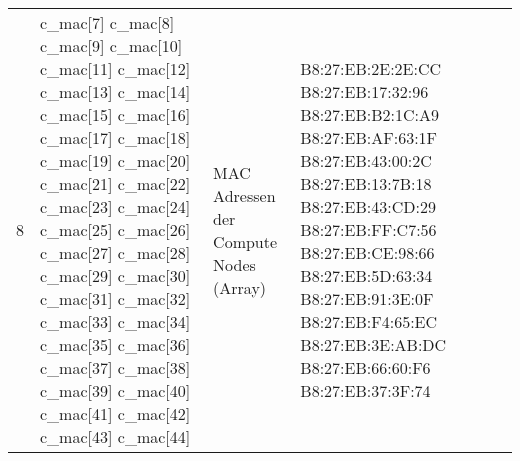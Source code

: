 \begin{longtable}{| p{0.5cm} | p{3cm} | p{8.5cm} | p{4cm} |}
8 & c\_mac[7] \newline c\_mac[8] \newline c\_mac[9] \newline  c\_mac[10] \newline c\_mac[11] \newline c\_mac[12] \newline c\_mac[13] \newline c\_mac[14] \newline c\_mac[15] \newline c\_mac[16] \newline c\_mac[17] \newline c\_mac[18] \newline c\_mac[19] \newline c\_mac[20] \newline c\_mac[21] \newline c\_mac[22] \newline c\_mac[23] \newline c\_mac[24] \newline c\_mac[25] \newline c\_mac[26] \newline c\_mac[27] \newline c\_mac[28] \newline c\_mac[29] \newline c\_mac[30] \newline c\_mac[31] \newline c\_mac[32] \newline c\_mac[33] \newline c\_mac[34] \newline c\_mac[35] \newline c\_mac[36] \newline c\_mac[37] \newline c\_mac[38] \newline c\_mac[39] \newline c\_mac[40] \newline c\_mac[41] \newline c\_mac[42] \newline c\_mac[43] \newline c\_mac[44] & MAC Adressen der Compute Nodes (Array) & B8:27:EB:2E:2E:CC \newline B8:27:EB:17:32:96 \newline B8:27:EB:B2:1C:A9 \newline B8:27:EB:AF:63:1F \newline B8:27:EB:43:00:2C \newline B8:27:EB:13:7B:18 \newline B8:27:EB:43:CD:29 \newline B8:27:EB:FF:C7:56 \newline B8:27:EB:CE:98:66 \newline B8:27:EB:5D:63:34 \newline B8:27:EB:91:3E:0F \newline B8:27:EB:F4:65:EC \newline B8:27:EB:3E:AB:DC \newline B8:27:EB:66:60:F6 \newline B8:27:EB:37:3F:74 
\end{longtable}
